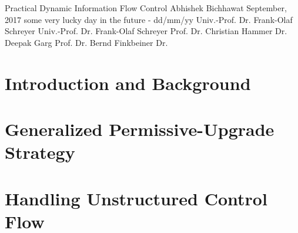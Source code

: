 \documentclass[a4paper,10pt,twoside,openright]{book}
\begin{document}
\frontmatter

\ThesisTitle
    {Practical Dynamic Information Flow Control} %
    {Abhishek Bichhawat}               %
    {September, 2017}                  %
    {some very lucky day in the future - dd/mm/yy}	 %
    {Univ.-Prof. Dr. Frank-Olaf Schreyer}		%
    {Univ.-Prof. Dr. Frank-Olaf Schreyer}		%
    {Prof. Dr. Christian Hammer}                %
    {Dr. Deepak Garg}            %
    {Prof. Dr. Bernd Finkbeiner}						%
    {Dr. }						%




\pagestyle{empty}

\clearpage

% 
\clearpage


\clearpage


\pagestyle{fancyplain} %
\tableofcontents
{}


\mainmatter\setcounter{page}{1}

\cleardoublepage
\part{Introduction and Background}
\cleardoublepage


% 

\cleardoublepage
\part{Generalized Permissive-Upgrade Strategy}
\cleardoublepage



\cleardoublepage
\part{Handling Unstructured Control Flow} 
\cleardoublepage


\cleardoublepage
\end{document}
